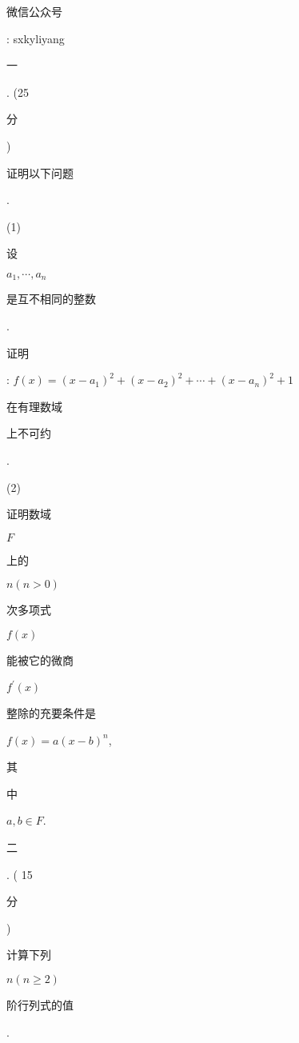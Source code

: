 \documentclass[10pt]{article}
\begin{document}
\begin{CJK}{UTF8}{mj}微信公众号\end{CJK}: sxkyliyang

\begin{CJK}{UTF8}{mj}一\end{CJK}. (25 \begin{CJK}{UTF8}{mj}分\end{CJK}) \begin{CJK}{UTF8}{mj}证明以下问题\end{CJK}.

(1) \begin{CJK}{UTF8}{mj}设\end{CJK} $a_{1}, \cdots, a_{n}$ \begin{CJK}{UTF8}{mj}是互不相同的整数\end{CJK}. \begin{CJK}{UTF8}{mj}证明\end{CJK}: $f(x)=\left(x-a_{1}\right)^{2}+\left(x-a_{2}\right)^{2}+\cdots+\left(x-a_{n}\right)^{2}+1$ \begin{CJK}{UTF8}{mj}在有理数域\end{CJK} \begin{CJK}{UTF8}{mj}上不可约\end{CJK}.

(2) \begin{CJK}{UTF8}{mj}证明数域\end{CJK} $F$ \begin{CJK}{UTF8}{mj}上的\end{CJK} $n(n>0)$ \begin{CJK}{UTF8}{mj}次多项式\end{CJK} $f(x)$ \begin{CJK}{UTF8}{mj}能被它的微商\end{CJK} $f^{\prime}(x)$ \begin{CJK}{UTF8}{mj}整除的充要条件是\end{CJK} $f(x)=a(x-b)^{n}$, \begin{CJK}{UTF8}{mj}其\end{CJK} \begin{CJK}{UTF8}{mj}中\end{CJK} $a, b \in F$.

\begin{CJK}{UTF8}{mj}二\end{CJK}. ( 15 \begin{CJK}{UTF8}{mj}分\end{CJK}) \begin{CJK}{UTF8}{mj}计算下列\end{CJK} $n(n \geqslant 2)$ \begin{CJK}{UTF8}{mj}阶行列式的值\end{CJK}.
\end{document}
